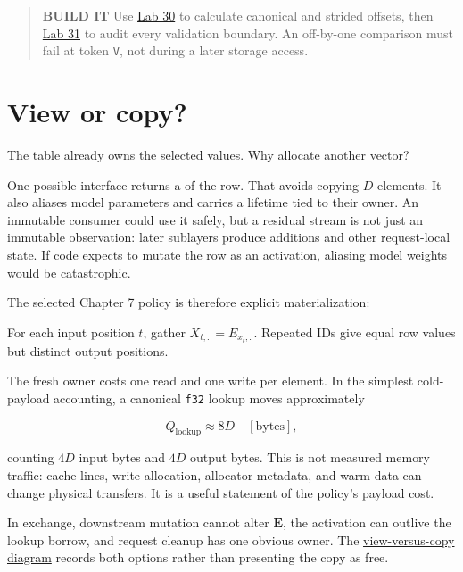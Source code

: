 \begin{quote}
\textbf{BUILD IT} Use
\href{https://github.com/hermonai/inside-the-llm-engine/blob/astra-visual-rewrite/labs/lab-30-inspect-embedding-row.md}{Lab
30} to calculate canonical and strided offsets, then
\href{https://github.com/hermonai/inside-the-llm-engine/blob/astra-visual-rewrite/labs/lab-31-checked-embedding-lookup.md}{Lab
31} to audit every validation boundary. An off-by-one comparison must
fail at token \texttt{V}, not during a later storage access.
\end{quote}

\section{View or copy?}\label{view-or-copy}

The table already owns the selected values. Why allocate another vector?

One possible interface returns a
\texttt{} of the row. That avoids copying
\(D\) elements. It also aliases model parameters and carries a lifetime
tied to their owner. An immutable consumer could use it safely, but a
residual stream is not just an immutable observation: later sublayers
produce additions and other request-local state. If code expects to
mutate the row as an activation, aliasing model weights would be
catastrophic.

The selected Chapter 7 policy is therefore explicit materialization:

For each input position $t$, gather $X_{t,:}=E_{x_t,:}$. Repeated IDs give equal row values but distinct output positions.

The fresh owner costs one read and one write per element. In the
simplest cold-payload accounting, a canonical \texttt{f32} lookup moves
approximately

\begin{equation}
Q_{\mathrm{lookup}}\approx 8D\quad[\mathrm{bytes}],
\end{equation}

counting \(4D\) input bytes and \(4D\) output bytes. This is not
measured memory traffic: cache lines, write allocation, allocator
metadata, and warm data can change physical transfers. It is a useful
statement of the policy's payload cost.

In exchange, downstream mutation cannot alter \(\mathbf{E}\), the
activation can outlive the lookup borrow, and request cleanup has one
obvious owner. The
\href{https://github.com/hermonai/inside-the-llm-engine/blob/astra-visual-rewrite/diagrams/transformer/embedding-view-vs-copy.txt}{view-versus-copy
diagram} records both options rather than presenting the copy as free.

